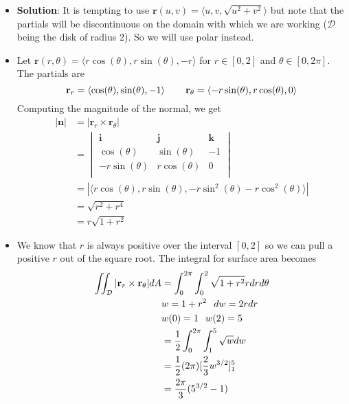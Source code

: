 \documentclass{article}
\begin{document}
    \begin{itemize}
        \item \textbf{Solution}: It is tempting to use $\mathbf{r}(u,v) = \langle u,v, \sqrt{u^2+v^2} \rangle$ but note that the partials will be discontinuous on the domain with which we are working ($\mathcal{D}$ being the disk of radius 2). So we will use polar instead.
        \item Let $\mathbf{r}(r, \theta) = \langle r\cos(\theta), r\sin(\theta), -r \rangle$ for $r \in [0,2]$ and $\theta \in [0,2\pi]$. The partials are
        \[ \mathbf{r}_r = \langle \cos(\theta), \sin(\theta), -1 \rangle \hspace{0.3in} \mathbf{r}_{\theta} = 
        \langle -r\sin(\theta), r\cos(\theta), 0 \rangle\]
        Computing the magnitude of the normal, we get
        \begin{align*}
            |\mathbf{n}| &= |\mathbf{r}_r \times \mathbf{r}_{\theta}| \\
            &= \begin{vmatrix} 
                \mathbf{i} & \mathbf{j} & \mathbf{k} \\
                \cos(\theta) & \sin(\theta) & -1 \\
                -r\sin(\theta) & r\cos(\theta) & 0 \\
            \end{vmatrix} \\
            &= |\langle r\cos(\theta), r\sin(\theta) ,-r\sin^2(\theta)-r\cos^2(\theta) \rangle| \\
            &= \sqrt{r^2 + r^4} \\
            &= r\sqrt{1+r^2}
        \end{align*}
        \item We know that $r$ is always positive over the interval $[0,2]$ so we can pull a positive $r$ out of the square root. The integral for surface area becomes
        \begin{align*}
            \iint_{\mathcal{D}} |\mathbf{r}_r \times \mathbf{r}_{\theta}| dA &= \int_0^{2\pi} \int_0^2 \sqrt{1+r^2}rdrd\theta \\
            &w = 1+r^2 \hspace{0.1in} dw = 2rdr\\
            &w(0) = 1 \hspace{0.1in} w(2) = 5\\
            &= \frac{1}{2}\int_0^{2\pi} \int_1^5 \sqrt{w}dw \\
            &= \frac{1}{2}(2\pi)[\frac{2}{3}w^{3/2}]_1^5 \\
            &= \frac{2\pi}{3}(5^{3/2}-1)
        \end{align*}
    \end{itemize}
    
\end{document}
